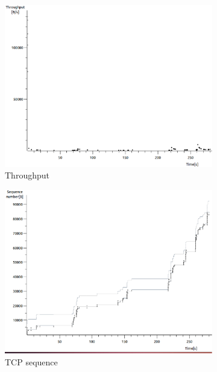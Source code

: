 \documentclass[conference,a4paper]{../../sty/IEEEtran}
\begin{document}
\begin{figure}
 \centering
 \begin{subfigure}[b]{0.2\textwidth}
  \includegraphics[width=\textwidth]{s2-2_thru}
  \caption{Throughput}
 \end{subfigure}
 \begin{subfigure}[b]{0.2\textwidth}
  \includegraphics[width=\textwidth]{s2-2_seq}
  \caption{TCP sequence}
 \end{subfigure}
 \begin{subfigure}[b]{0.2\textwidth}

\end{subfigure}
\end{figure}
\end{document}

